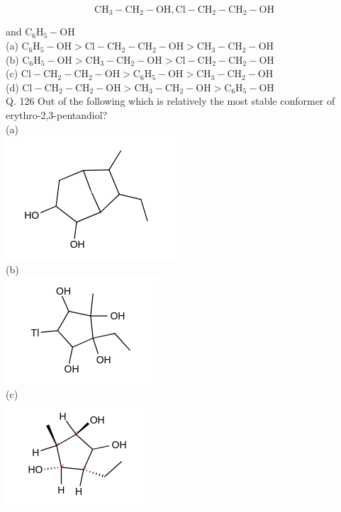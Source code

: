 \documentclass[10pt]{article}
\begin{document}
$$
\mathrm{CH}_{3}-\mathrm{CH}_{2}-\mathrm{OH}, \mathrm{Cl}-\mathrm{CH}_{2}-\mathrm{CH}_{2}-\mathrm{OH}
$$

and $\mathrm{C}_{6} \mathrm{H}_{5}-\mathrm{OH}$\\
(a) $\mathrm{C}_{6} \mathrm{H}_{5}-\mathrm{OH}>\mathrm{Cl}-\mathrm{CH}_{2}-\mathrm{CH}_{2}-\mathrm{OH}>\mathrm{CH}_{3}-\mathrm{CH}_{2}-\mathrm{OH}$\\
(b) $\mathrm{C}_{6} \mathrm{H}_{5}-\mathrm{OH}>\mathrm{CH}_{3}-\mathrm{CH}_{2}-\mathrm{OH}>\mathrm{Cl}-\mathrm{CH}_{2}-\mathrm{CH}_{2}-\mathrm{OH}$\\
(c) $\mathrm{Cl}-\mathrm{CH}_{2}-\mathrm{CH}_{2}-\mathrm{OH}>\mathrm{C}_{6} \mathrm{H}_{5}-\mathrm{OH}>\mathrm{CH}_{3}-\mathrm{CH}_{2}-\mathrm{OH}$\\
(d) $\mathrm{Cl}-\mathrm{CH}_{2}-\mathrm{CH}_{2}-\mathrm{OH}>\mathrm{CH}_{3}-\mathrm{CH}_{2}-\mathrm{OH}>\mathrm{C}_{6} \mathrm{H}_{5}-\mathrm{OH}$\\
Q. 126 Out of the following which is relatively the most stable conformer of erythro-2,3-pentandiol?\\
(a)\\
\includegraphics{smile-0a198d31aa2c12f2d28dd29a7a925b8c56271028}\\
(b)\\
\includegraphics{smile-498b89574dde991ff697b927d41c97317a8132c1}\\
(c)\\
\includegraphics{smile-cf5d0352b049d3da462de99a91cd27ebc317e288}\\
\end{document}
